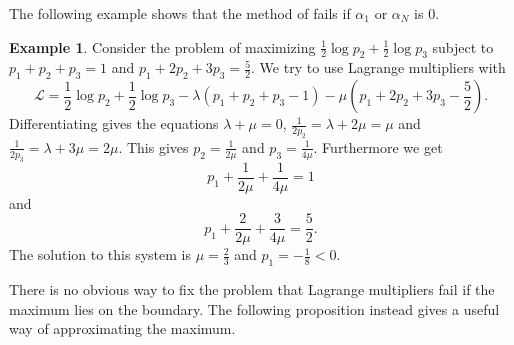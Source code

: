 \documentclass{article}
\theoremstyle{plain}
\theoremstyle{definition}
\newtheorem{example}     {\bf Example}     [section]
\begin{document}
The following example shows that the method of  fails if $\alpha_1$
or $\alpha_N$ is $0$.
\begin{example}
	Consider the problem of maximizing $\frac12\log p_2+\frac12\log p_3$ subject
	to $p_1+p_2+p_3=1$ and $p_1+2p_2+3p_3=\frac52$. We try to use Lagrange multipliers
	with $$\mathcal L=\frac12\log p_2+\frac12\log p_3-\lambda(p_1+p_2+p_3-1)-\mu(p_1+
	2p_2+3p_3-\frac52).$$
	Differentiating gives the equations $\lambda+\mu=0$, $\frac1{2p_2}=\lambda+2\mu=\mu$
	and $\frac1{2p_3}=\lambda+3\mu=2\mu$. This gives $p_2=\frac1{2\mu}$ and $p_3=\frac1
	{4\mu}$. Furthermore we get $$p_1+\frac1{2\mu}+\frac1{4\mu}=1$$ and
	$$p_1+\frac2{2\mu}+\frac3{4\mu}=\frac52.$$ The solution to this system is
	$\mu=\frac23$ and $p_1=-\frac18<0$.
\end{example}

There is no obvious way to fix the problem that Lagrange multipliers fail if
the maximum lies on the boundary. The following proposition instead gives a
useful way of approximating the maximum.
\end{document}
